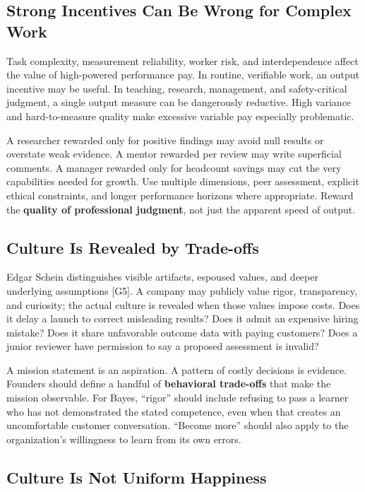 \subsection{Strong Incentives Can Be Wrong for Complex Work}
\label{sec:strong_incentives_complex_work}

Task complexity, measurement reliability, worker risk, and interdependence affect the value of high-powered performance pay. In routine, verifiable work, an output incentive may be useful. In teaching, research, management, and safety-critical judgment, a single output measure can be dangerously reductive. High variance and hard-to-measure quality make excessive variable pay especially problematic.

A researcher rewarded only for positive findings may avoid null results or overstate weak evidence. A mentor rewarded per review may write superficial comments. A manager rewarded only for headcount savings may cut the very capabilities needed for growth. Use multiple dimensions, peer assessment, explicit ethical constraints, and longer performance horizons where appropriate. Reward the \textbf{quality of professional judgment}, not just the apparent speed of output.

\subsection{Culture Is Revealed by Trade-offs}
\label{sec:culture_revealed_by_tradeoffs}

Edgar Schein distinguishes visible artifacts, espoused values, and deeper underlying assumptions [G5]. A company may publicly value rigor, transparency, and curiosity; the actual culture is revealed when those values impose costs. Does it delay a launch to correct misleading results? Does it admit an expensive hiring mistake? Does it share unfavorable outcome data with paying customers? Does a junior reviewer have permission to say a proposed assessment is invalid?

A mission statement is an aspiration. A pattern of costly decisions is evidence. Founders should define a handful of \textbf{behavioral trade-offs} that make the mission observable. For Bayes, ``rigor'' should include refusing to pass a learner who has not demonstrated the stated competence, even when that creates an uncomfortable customer conversation. ``Become more'' should also apply to the organization's willingness to learn from its own errors.

\subsection{Culture Is Not Uniform Happiness}
\label{sec:culture_not_uniform_happiness}

